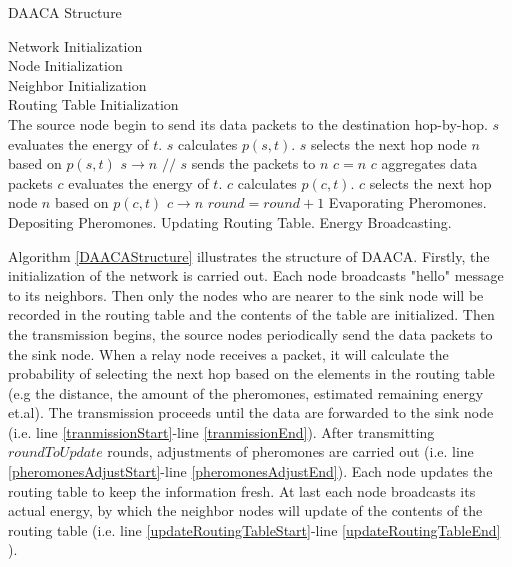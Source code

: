 \documentclass{elsarticle}
\begin{document}
\begin{algorithm}
\caption{DAACA Structure} \label{DAACAStructure}
\begin{algorithmic}[1]
\STATE Network Initialization \\ \label{networkInitialization}
Node Initialization \\
Neighbor Initialization \\
Routing Table Initialization \\
\STATE The source node begin to send its data packets to the destination hop-by-hop.
 \label{tranmissionStart}
\STATE $s$ evaluates the energy of $t$.
\STATE $s$ calculates $p(s,t)$.
\STATE $s$ selects the next hop node $n$ based on $p(s,t)$
\ENDFOR
\STATE $s\longrightarrow n$ $//$ $s$ sends the packets to $n$
\STATE $c = n$
\STATE $c$ aggregates data packets
\STATE $c$ evaluates the energy of $t$.
\STATE $c$ calculates $p(c,t)$.
\STATE $c$ selects the next hop node $n$ based on $p(c,t)$
\ENDFOR
\STATE $c \longrightarrow n$
\ENDWHILE \label{tranmissionEnd}
\STATE $round = round + 1$
 \label{pheromonesAdjustStart}
\STATE Evaporating Pheromones.
\STATE Depositing Pheromones.\label{pheromonesAdjustEnd}
\STATE Updating Routing Table. \label{updateRoutingTableStart}
\STATE Energy Broadcasting. \label{updateRoutingTableEnd}
\ENDIF
\end{algorithmic}
\end{algorithm}

Algorithm \ref{DAACAStructure} illustrates the structure of DAACA. Firstly, the initialization of the network is carried out. Each node broadcasts "hello" message to its neighbors. Then only the nodes who are nearer to the sink node will be recorded in the routing table and the contents of the table are initialized. Then the transmission begins, the source nodes periodically send the data packets to the sink node. When a relay node receives a packet, it will calculate the probability of selecting the next hop based on the elements in the routing table (e.g the distance, the amount of the pheromones, estimated remaining energy et.al). The transmission proceeds until the data are forwarded to the sink node (i.e. line \ref{tranmissionStart}-line \ref{tranmissionEnd}). After transmitting $roundToUpdate$ rounds, adjustments of pheromones are carried out (i.e. line \ref{pheromonesAdjustStart}-line \ref{pheromonesAdjustEnd}). Each node updates the routing table to keep the information fresh. At last each node broadcasts its actual energy, by which the neighbor nodes will update of the contents of the routing table (i.e. line \ref{updateRoutingTableStart}-line \ref{updateRoutingTableEnd} ).
\end{document}
